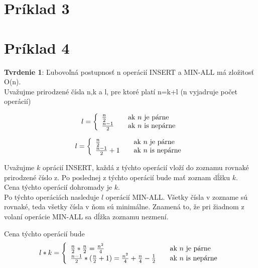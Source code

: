 \documentclass[paper=a4, fontsize=11pt]{scrartcl} %
\numberwithin{equation}{section} %
\numberwithin{figure}{section} %
\numberwithin{table}{section} %
\begin{document}
\section*{Príklad 3}

\pagebreak

\section*{Príklad 4}

\textbf{Tvrdenie 1}: Ľubovoľná postupnosť n operácií INSERT  a MIN-ALL má zložitosť O(n). \\

Uvažujme prirodzené čísla n,k a l, pre ktoré platí n=k+l (n vyjadruje počet operácií)

\[ l = \left\{ 
  \begin{array}{l l}
    \frac{n}{2} & \quad \text{ak $n$ je párne}\\
    \frac{n-1}{2} & \quad \text{ak $n$ is nepárne}
  \end{array} \right.\]

\[ l = \left\{ 
  \begin{array}{l l}
    \frac{n}{2} & \quad \text{ak $n$ je párne}\\
    \frac{n-1}{2} + 1 & \quad \text{ak $n$ is nepárne}
  \end{array} \right.\]


Uvažujme $k$ oprácií INSERT, každá z týchto operácií vloží do zoznamu rovnaké prirodzené číslo z.
Po poslednej z týchto operácií bude mať zoznam dĺžku $k$. \\

Cena týchto operácií dohromady je $k$. \\

Po týchto operáciách nasleduje $l$ operácií MIN-ALL.
Všetky čísla v zozname sú rovnaké, teda všetky čísla v ňom sú minimálne.
Znamená to, že pri žiadnom z volaní operácie MIN-ALL sa dĺžka zoznamu nezmení.


Cena týchto operácií bude 
\[ l*k = \left\{ 
  \begin{array}{l l}
    \frac{n}{2}* \frac{n}{2} = \frac{n^2}{4} & \quad \text{ak $n$ je párne}\\
    \frac{n-1}{2}* (\frac{n}{2} + 1) = \frac{n^2}{4} + \frac{n}{4} - \frac{1}{2} & \quad \text{ak $n$ is nepárne}
  \end{array} \right.\]
\end{document}
